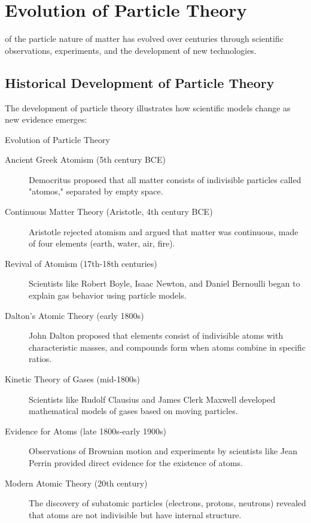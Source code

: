 
\section{Evolution of Particle Theory}

 of the particle nature of matter has evolved over centuries through scientific observations, experiments, and the development of new technologies.

\subsection{Historical Development of Particle Theory}

The development of particle theory illustrates how scientific models change as new evidence emerges:

\begin{keyconcept}{Evolution of Particle Theory}
\begin{description}
    \item[Ancient Greek Atomism (5th century BCE)] Democritus proposed that all matter consists of indivisible particles called "atomos," separated by empty space.
    
    \item[Continuous Matter Theory (Aristotle, 4th century BCE)] Aristotle rejected atomism and argued that matter was continuous, made of four elements (earth, water, air, fire).
    
    \item[Revival of Atomism (17th-18th centuries)] Scientists like Robert Boyle, Isaac Newton, and Daniel Bernoulli began to explain gas behavior using particle models.
    
    \item[Dalton's Atomic Theory (early 1800s)] John Dalton proposed that elements consist of indivisible atoms with characteristic masses, and compounds form when atoms combine in specific ratios.
    
    \item[Kinetic Theory of Gases (mid-1800s)] Scientists like Rudolf Clausius and James Clerk Maxwell developed mathematical models of gases based on moving particles.
    
    \item[Evidence for Atoms (late 1800s-early 1900s)] Observations of Brownian motion and experiments by scientists like Jean Perrin provided direct evidence for the existence of atoms.
    
    \item[Modern Atomic Theory (20th century)] The discovery of subatomic particles (electrons, protons, neutrons) revealed that atoms are not indivisible but have internal structure.
\end{description}
\end{keyconcept}

